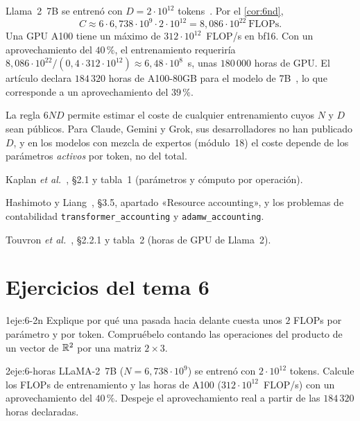 \begin{ejemplo}\label{ej:coste7b}
Llama~2~7B se entrenó con $D=2\cdot 10^{12}$ tokens~\cite[§2.1]{llama2}. Por el \cref{cor:6nd},
\[
C\approx 6\cdot 6{,}738\cdot 10^{9}\cdot 2\cdot 10^{12}=8{,}086\cdot 10^{22}~\text{FLOPs}.
\]
Una GPU A100 tiene un máximo de $312\cdot 10^{12}$~FLOP/s en bf16. Con un aprovechamiento del $40\,\%$, el entrenamiento requeriría $8{,}086\cdot 10^{22}/(0{,}4\cdot 312\cdot 10^{12})\approx 6{,}48\cdot 10^{8}$~s, unas $180\,000$ horas de GPU. El artículo declara $184\,320$ horas de A100-80GB para el modelo de 7B~\cite[tabla~2]{llama2}, lo que corresponde a un aprovechamiento del $39\,\%$.
\end{ejemplo}

\begin{observacion}
La regla $6ND$ permite estimar el coste de cualquier entrenamiento cuyos $N$ y $D$ sean públicos. Para Claude, Gemini y Grok, sus desarrolladores no han publicado $D$, y en los modelos con mezcla de expertos (módulo~18) el coste depende de los parámetros \emph{activos} por token, no del total.
\end{observacion}

\begin{lecturas}
\item Kaplan \emph{et al.}~\cite{kaplan}, §2.1 y tabla~1 (parámetros y cómputo por operación).
\item Hashimoto y Liang~\cite{cs336}, §3.5, apartado «Resource accounting», y los problemas de contabilidad \texttt{transformer\_accounting} y \texttt{adamw\_accounting}.
\item Touvron \emph{et al.}~\cite{llama2}, §2.2.1 y tabla~2 (horas de GPU de Llama~2).
\end{lecturas}

\section*{Ejercicios del tema 6}

\begin{ejercicio}{1}{eje:6-2n}
Explique por qué una pasada hacia delante cuesta unos $2$ FLOPs por parámetro y por token. Compruébelo contando las operaciones del producto de un vector de $\mathbb{R}^{2}$ por una matriz $2\times 3$.
\end{ejercicio}

\begin{ejercicio}{2}{eje:6-horas}
LLaMA-2~7B ($N=6{,}738\cdot 10^{9}$) se entrenó con $2\cdot 10^{12}$ tokens. Calcule los FLOPs de entrenamiento y las horas de A100 ($312\cdot 10^{12}$~FLOP/s) con un aprovechamiento del $40\,\%$. Despeje el aprovechamiento real a partir de las $184\,320$ horas declaradas.
\end{ejercicio}

